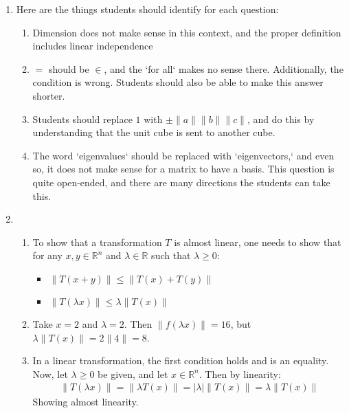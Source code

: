 \documentclass[red]{tutorial}
\newcommand{\R}{\mathbb{R}}
\theoremstyle{definition}
\theoremstyle{theorem}
\begin{document}
\begin{solutions}
  \begin{enumerate}
    \item Here are the things students should identify for 
      each question:
      \begin{enumerate}
        \item Dimension does not make sense in this context, and 
          the proper definition includes linear independence
        \item $=$ should be $\in$, and the `for all` makes no 
          sense there. Additionally, the condition is wrong. Students 
          should also be able to make this answer shorter.
        \item Students should replace $1$ with $\pm \|a\|\|b\|\|c\|$, 
          and do this by understanding that the unit cube is sent to 
          another cube.
        \item The word `eigenvalues` should be replaced with 
          `eigenvectors,` and even so, it does not make sense 
          for a matrix to have a basis. This question is quite 
          open-ended, and there are many directions the students 
          can take this.
      \end{enumerate}
    \item 
      \begin{enumerate}
        \item To show that a transformation $T$ is almost 
          linear, one needs to show that for any $x,y\in \R^n$ and 
          $\lambda \in \R$ such that $\lambda\ge 0$:
          \begin{itemize}
            \item $\|T(x+y)\| \le \|T(x)+T(y)\|$
            \item $\|T(\lambda x)\| \le \lambda \|T(x)\|$
          \end{itemize}
        \item Take $x = 2$ and $\lambda = 2$. Then 
          $\|f(\lambda x)\| = 16$, but 
          $\lambda \|T(x)\| = 2 \|4\| = 8$.
        \item In a linear transformation, the first condition 
          holds and is an equality. Now, let $\lambda \ge0$ be 
          given, and let $x\in \R^n$. Then by linearity:
          \begin{align*}
            \|T(\lambda x)\| = \|\lambda T(x)\|
            =|\lambda|\|T(x)\| = \lambda \|T(x)\|
          \end{align*}
          Showing almost linearity.

\end{enumerate}
\end{enumerate}
\end{solutions}
\end{document}
